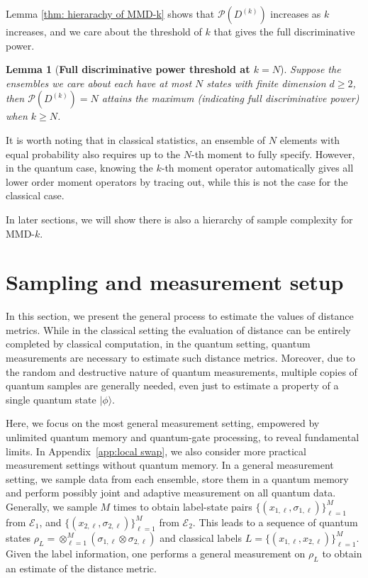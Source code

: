 \documentclass[aps,prx,reprint,superscriptaddress,amsmath,amssymb,longbibliography,floatfix]{revtex4-2}
\providecommand{\ket}[1]{|#1 \rangle}
\newcommand{\scE}{\mathcal{E}}
\newcommand{\scP}{\mathcal{P}}
\theoremstyle{plain}
\newtheorem{lemma}[theorem]{Lemma}
\theoremstyle{definition}
\theoremstyle{remark}
\begin{document}
Lemma \ref{thm: hierarachy of MMD-k} shows that $\scP(D^{(k)})$ increases as $k$ increases, and we care about the threshold of $k$ that gives the full discriminative power.
\begin{lemma}[\textbf{Full discriminative power threshold at $k=N$}]
    Suppose the ensembles we care about each have at most $N$ states with finite dimension $d\ge2$, then $\scP(D^{(k)})=N$ attains the maximum (indicating full discriminative power) when $k\ge N$. \label{thm: k to reach full disriminative power}
\end{lemma}

It is worth noting that in classical statistics, an ensemble of $N$ elements with equal probability also requires up to the $N$-th moment to fully specify. However, in the quantum case, knowing the $k$-th moment operator automatically gives all lower order moment operators by tracing out, while this is not the case for the classical case. 


In later sections, we will show there is also a hierarchy of sample complexity for MMD-$k$.




\section{Sampling and measurement setup}
In this section, we present the general process to estimate the values of distance metrics. While in the classical setting the evaluation of distance can be entirely completed by classical computation, in the quantum setting, quantum measurements are necessary to estimate such distance metrics. Moreover, due to the random and destructive nature of quantum measurements, multiple copies of quantum samples are generally needed, even just to estimate a property of a single quantum state $\ket{\phi}$. %

Here, we focus on the most general measurement setting, empowered by unlimited quantum memory and quantum-gate processing, to reveal fundamental limits. In Appendix~\ref{app:local swap}, we also consider more practical measurement settings without quantum memory. In a general measurement setting, we sample data from each ensemble, store them in a quantum memory and perform possibly joint and adaptive measurement on all quantum data. Generally, we sample $M$ times to obtain label-state pairs $\{(x_{1,\ell},\sigma_{1,\ell})\}_{\ell=1}^{M}$ from $\scE_1$, and $\{(x_{2,\ell},\sigma_{2,\ell})\}_{\ell=1}^{M}$ from $\scE_2$. This leads to a sequence of quantum states $\rho_L=\otimes_{\ell=1}^{M} (\sigma_{1,\ell}\otimes\sigma_{2,\ell})$ and classical labels $L=\{(x_{1,\ell},x_{2,\ell})\}_{\ell=1}^M$. Given the label information, one performs a general measurement on $\rho_L$ to obtain an estimate of the distance metric. 
\end{document}
